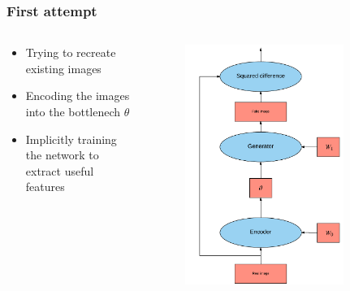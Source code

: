 \documentclass{beamer}
\begin{document}
\begin{frame}
\frametitle{First attempt}
\begin{columns}
\begin{column}{0.5\textwidth}
\begin{itemize}
	\item Trying to recreate existing images
	\item Encoding the images into the bottlenech $\theta$
	\item Implicitly training the network to extract useful features
\end{itemize}
\end{column}
\begin{column}{0.5\textwidth}  %
\begin{figure}[h!]
	\centering
	\includegraphics[width=0.8\textwidth]{autoencoder_attempt.png}
\end{figure}
\end{column}
\end{columns}

\end{frame}
\end{document}
